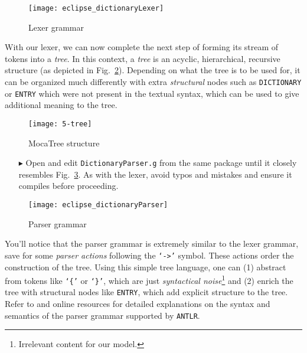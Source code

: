 \begin{figure}[!htbp]
\begin{center}
  \texttt{[image: eclipse\_dictionaryLexer]}
  \caption{Lexer grammar}
  \label{eclipse:dictionaryLexer}
\end{center}
\end{figure}

With our lexer, we can now complete the next step of forming its stream of tokens into a \emph{tree}. In this context, a \emph{tree} is an acyclic,
hierarchical, recursive structure (as depicted in Fig.~\ref{eclipse:dictLexer}). Depending on what the tree is to be used for, it can be organized much
differently with extra \emph{structural} nodes such as \texttt{DICTIONARY} or \texttt{ENTRY} which were not present in the textual syntax, which can be used to
give additional meaning to the tree.

\begin{figure}[htp]
\begin{center}
 \texttt{[image: 5-tree]}
  \caption{MocaTree structure}
  \label{eclipse:dictLexer}
\end{center}
\end{figure}

\begin{itemize}

\item[$\blacktriangleright$] Open and edit \texttt{DictionaryParser.g} from the same package until it closely resembles Fig.~\ref{eclipse:dictParser}. As with
the lexer, avoid typos and mistakes and ensure it compiles before proceeding.

\end{itemize}

\begin{figure}[!htbp]
\begin{center}
 \texttt{[image: eclipse\_dictionaryParser]}
  \caption{Parser grammar}
  \label{eclipse:dictParser}
\end{center}
\end{figure}

\newpage

You'll notice that the parser grammar is extremely similar to the lexer grammar, save for some \emph{parser actions} following the \texttt{`->'} symbol. These
actions order the construction of the tree. Using this simple tree language, one can (1) abstract from tokens like \texttt{`\{'} or \texttt{`\}'}, which are
just \emph{syntactical noise}\footnote{Irrelevant content for our model.} and (2) enrich the tree with structural nodes like \texttt{ENTRY}, which add explicit
structure to the tree. Refer to \cite{ANTLR} and online resources for detailed explanations on the syntax and semantics of the parser grammar supported by
\texttt{ANTLR}.

